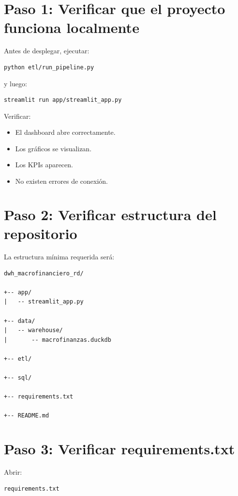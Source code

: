 \section{Paso 1: Verificar que el proyecto funciona localmente}

Antes de desplegar, ejecutar:

\begin{lstlisting}[language=bash]
python etl/run_pipeline.py
\end{lstlisting}

y luego:

\begin{lstlisting}[language=bash]
streamlit run app/streamlit_app.py
\end{lstlisting}

Verificar:

\begin{itemize}
\item El dashboard abre correctamente.
\item Los gráficos se visualizan.
\item Los KPIs aparecen.
\item No existen errores de conexión.
\end{itemize}

\section{Paso 2: Verificar estructura del repositorio}

La estructura mínima requerida será:

\begin{verbatim}
dwh_macrofinanciero_rd/

+-- app/
|   -- streamlit_app.py

+-- data/
|   -- warehouse/
|       -- macrofinanzas.duckdb

+-- etl/

+-- sql/

+-- requirements.txt

+-- README.md
\end{verbatim}

\section{Paso 3: Verificar requirements.txt}

Abrir:

\begin{verbatim}
requirements.txt
\end{verbatim}

